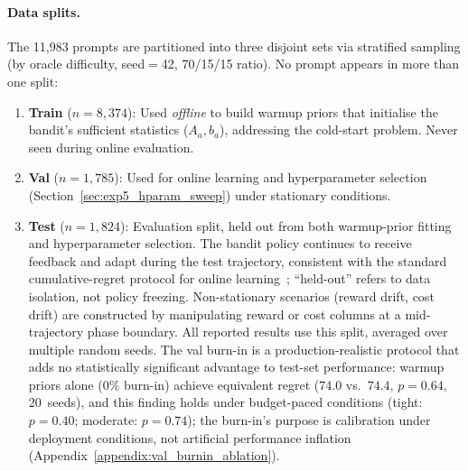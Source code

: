 \paragraph{Data splits.}
The 11,983 prompts are partitioned into three disjoint sets via stratified sampling (by oracle difficulty, seed$=$42, 70/15/15 ratio).  No prompt appears in more than one split:
\begin{enumerate}[nosep,leftmargin=*]
  \item \textbf{Train} ($n{=}8{,}374$): Used \emph{offline} to build warmup priors that initialise the bandit's sufficient statistics ($A_a, b_a$), addressing the cold-start problem.  Never seen during online evaluation.
  \item \textbf{Val} ($n{=}1{,}785$): Used for online learning and hyperparameter selection (Section~\ref{sec:exp5_hparam_sweep}) under stationary conditions.
  \item \textbf{Test} ($n{=}1{,}824$): Evaluation split, held out from both warmup-prior fitting and hyperparameter selection.  The bandit policy continues to receive feedback and adapt during the test trajectory, consistent with the standard cumulative-regret protocol for online learning~\cite{lattimore2020bandit}; ``held-out'' refers to data isolation, not policy freezing.  Non-stationary scenarios (reward drift, cost drift) are constructed by manipulating reward or cost columns at a mid-trajectory phase boundary.  All reported results use this split, averaged over multiple random seeds.  The val burn-in is a production-realistic protocol that adds no statistically significant advantage to test-set performance: warmup priors alone (0\% burn-in) achieve equivalent regret ($74.0$ vs.\ $74.4$, $p{=}0.64$, 20~seeds), and this finding holds under budget-paced conditions (tight: $p{=}0.40$; moderate: $p{=}0.74$); the burn-in's purpose is calibration under deployment conditions, not artificial performance inflation (Appendix~\ref{appendix:val_burnin_ablation}).
\end{enumerate}

